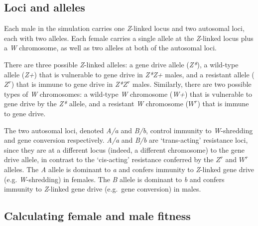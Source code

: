 \documentclass[]{rsos}%
\begin{document}
\hypertarget{loci-and-alleles}{%
\subsection{Loci and alleles}\label{loci-and-alleles}}

Each male in the simulation carries one \emph{Z}-linked locus and two
autosomal loci, each with two alleles. Each female carries a single
allele at the \emph{Z}-linked locus plus a \emph{W} chromosome, as well
as two alleles at both of the autosomal loci.

There are three possible \emph{Z}-linked alleles: a gene drive allele
(\emph{Z*}), a wild-type allele (\emph{Z+}) that is vulnerable to gene
drive in \emph{Z*Z+} males, and a resistant allele (\(Z^r\)) that is
immune to gene drive in \emph{Z*}\(Z^r\) males. Similarly, there are two
possible types of \emph{W} chromosomes: a wild-type \emph{W} chromosome
(\emph{W+}) that is vulnerable to gene drive by the \emph{Z*} allele,
and a resistant \emph{W} chromosome (\(W^r\)) that is immune to gene
drive.

The two autosomal loci, denoted \emph{A/a} and \emph{B/b}, control
immunity to \emph{W}-shredding and gene conversion respectively.
\emph{A/a} and \emph{B/b} are `trans-acting' resistance loci, since they
are at a different locus (indeed, a different chromosome) to the gene
drive allele, in contrast to the `cis-acting' resistance conferred by
the \(Z^r\) and \(W^r\) alleles. The \emph{A} allele is dominant to
\emph{a} and confers immunity to \emph{Z}-linked gene drive (e.g.
\emph{W}-shredding) in females. The \emph{B} allele is dominant to
\emph{b} and confers immunity to \emph{Z}-linked gene drive (e.g.~gene
conversion) in males.

\hypertarget{calculating-female-and-male-fitness}{%
\subsection{Calculating female and male
fitness}\label{calculating-female-and-male-fitness}}
\end{document}
